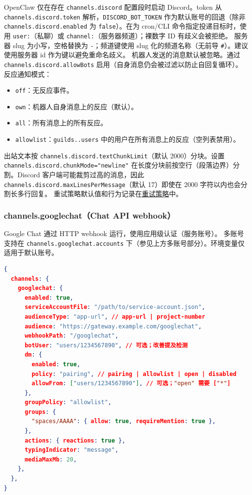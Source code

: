 OpenClaw 仅在存在 \texttt{channels.discord} 配置段时启动 Discord。token 从 \texttt{channels.discord.token} 解析，\texttt{DISCORD\_BOT\_TOKEN} 作为默认账号的回退（除非 \texttt{channels.discord.enabled} 为 \texttt{false}）。在为 cron/CLI 命令指定投递目标时，使用 \texttt{user:}（私聊）或 \texttt{channel:}（服务器频道）；裸数字 ID 有歧义会被拒绝。
服务器 slug 为小写，空格替换为 \texttt{-}；频道键使用 slug 化的频道名称（无前导 \texttt{\#}）。建议使用服务器 id 作为键以避免重命名歧义。
机器人发送的消息默认被忽略。通过 \texttt{channels.discord.allowBots} 启用（自身消息仍会被过滤以防止自回复循环）。
反应通知模式：

\begin{itemize}
  \item \texttt{off}：无反应事件。
  \item \texttt{own}：机器人自身消息上的反应（默认）。
  \item \texttt{all}：所有消息上的所有反应。
  \item \texttt{allowlist}：\texttt{guilds..users} 中的用户在所有消息上的反应（空列表禁用）。
\end{itemize}

出站文本按 \texttt{channels.discord.textChunkLimit}（默认 2000）分块。设置 \texttt{channels.discord.chunkMode="newline"} 在长度分块前按空行（段落边界）分割。Discord 客户端可能裁剪过高的消息，因此 \texttt{channels.discord.maxLinesPerMessage}（默认 17）即使在 2000 字符以内也会分割长多行回复。
重试策略默认值和行为记录在\href{/concepts/retry}{重试策略}中。

\subsubsection{channels.googlechat（Chat API webhook）}


Google Chat 通过 HTTP webhook 运行，使用应用级认证（服务账号）。
多账号支持在 \texttt{channels.googlechat.accounts} 下（参见上方多账号部分）。环境变量仅适用于默认账号。

\begin{lstlisting}[language=json]
{
  channels: {
    googlechat: {
      enabled: true,
      serviceAccountFile: "/path/to/service-account.json",
      audienceType: "app-url", // app-url | project-number
      audience: "https://gateway.example.com/googlechat",
      webhookPath: "/googlechat",
      botUser: "users/1234567890", // 可选；改善提及检测
      dm: {
        enabled: true,
        policy: "pairing", // pairing | allowlist | open | disabled
        allowFrom: ["users/1234567890"], // 可选；"open" 需要 ["*"]
      },
      groupPolicy: "allowlist",
      groups: {
        "spaces/AAAA": { allow: true, requireMention: true },
      },
      actions: { reactions: true },
      typingIndicator: "message",
      mediaMaxMb: 20,
    },
  },
}
\end{lstlisting}


